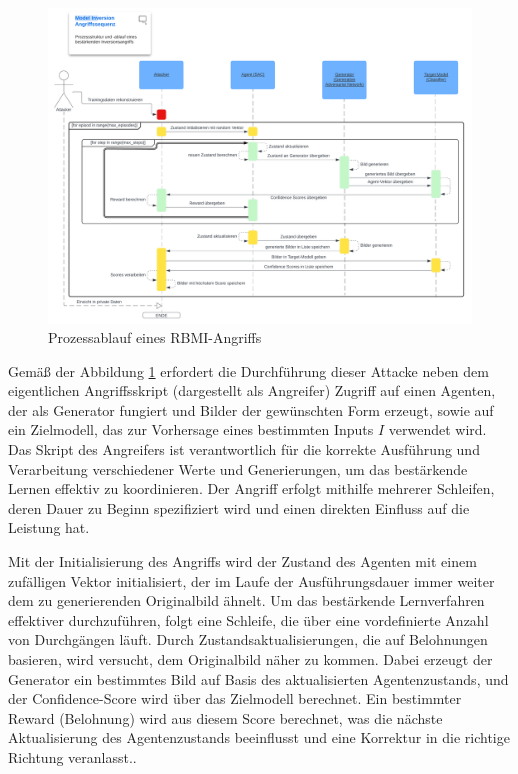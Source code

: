 \begin{figure}
	\centering
	\includegraphics[width=\linewidth]{Bilder/RBMI_PROCESS.png}
	\caption{Prozessablauf eines RBMI-Angriffs}
	\label{img:rbmi_process}
\end{figure}

Gemäß der Abbildung \ref{img:rbmi_process} erfordert die Durchführung dieser Attacke neben dem eigentlichen Angriffsskript (dargestellt als Angreifer) Zugriff auf einen Agenten, der als Generator fungiert und Bilder der gewünschten Form erzeugt, sowie auf ein Zielmodell, das zur Vorhersage eines bestimmten Inputs $I$ verwendet wird. Das Skript des Angreifers ist verantwortlich für die korrekte Ausführung und Verarbeitung verschiedener Werte und Generierungen, um das bestärkende Lernen effektiv zu koordinieren. Der Angriff erfolgt mithilfe mehrerer Schleifen, deren Dauer zu Beginn spezifiziert wird und einen direkten Einfluss auf die Leistung hat.

Mit der Initialisierung des Angriffs wird der Zustand des Agenten mit einem zufälligen Vektor initialisiert, der im Laufe der Ausführungsdauer immer weiter dem zu generierenden Originalbild ähnelt. Um das bestärkende Lernverfahren effektiver durchzuführen, folgt eine Schleife, die über eine vordefinierte Anzahl von Durchgängen läuft. Durch Zustandsaktualisierungen, die auf Belohnungen basieren, wird versucht, dem Originalbild näher zu kommen. Dabei erzeugt der Generator ein bestimmtes Bild auf Basis des aktualisierten Agentenzustands, und der Confidence-Score wird über das Zielmodell berechnet. Ein bestimmter Reward (Belohnung) wird aus diesem Score berechnet, was die nächste Aktualisierung des Agentenzustands beeinflusst und eine Korrektur \glqq in die richtige Richtung \grqq{} veranlasst..

